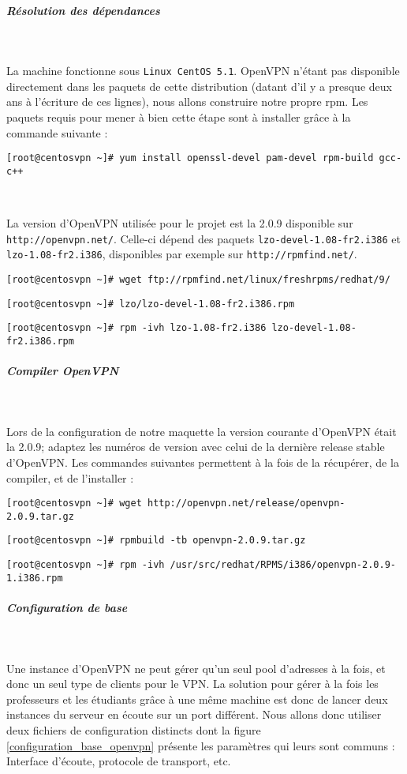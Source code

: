 \subparagraph{Résolution des dépendances}
~

La machine fonctionne sous \texttt{Linux CentOS 5.1}. OpenVPN n'étant pas disponible directement dans les paquets de cette distribution (datant d'il y a presque deux ans à l'écriture de ces lignes), nous allons construire notre propre rpm. Les paquets requis pour mener à bien cette étape sont à installer grâce à la commande suivante :

\verb|[root@centosvpn ~]# yum install openssl-devel pam-devel rpm-build gcc-c++|

~

La version d'OpenVPN utilisée pour le projet est la 2.0.9 disponible sur \verb|http://openvpn.net/|. Celle-ci dépend des paquets \verb|lzo-devel-1.08-fr2.i386| et \verb|lzo-1.08-fr2.i386|, disponibles par exemple sur \verb|http://rpmfind.net/|.

\verb|[root@centosvpn ~]# wget ftp://rpmfind.net/linux/freshrpms/redhat/9/|

\verb|[root@centosvpn ~]# lzo/lzo-devel-1.08-fr2.i386.rpm|

\verb|[root@centosvpn ~]# rpm -ivh lzo-1.08-fr2.i386 lzo-devel-1.08-fr2.i386.rpm|

\subparagraph{Compiler OpenVPN}
~

Lors de la configuration de notre maquette la version courante d'OpenVPN était la 2.0.9; adaptez les numéros de version avec celui de la dernière release stable d'OpenVPN. Les commandes suivantes permettent à la fois de la récupérer, de la compiler, et de l'installer :

\verb|[root@centosvpn ~]# wget http://openvpn.net/release/openvpn-2.0.9.tar.gz|

\verb|[root@centosvpn ~]# rpmbuild -tb openvpn-2.0.9.tar.gz|

\verb|[root@centosvpn ~]# rpm -ivh /usr/src/redhat/RPMS/i386/openvpn-2.0.9-1.i386.rpm|

\subparagraph{Configuration de base}
~

Une instance d'OpenVPN ne peut gérer qu'un seul pool d'adresses à la fois, et donc un seul type de clients pour le VPN. La solution pour gérer à la fois les professeurs et les étudiants grâce à une même machine est donc de lancer deux instances du serveur en écoute sur un port différent. Nous allons donc utiliser deux fichiers de configuration distincts dont la figure \ref{configuration_base_openvpn} présente les paramètres qui leurs sont communs : Interface d'écoute, protocole de transport, etc.

